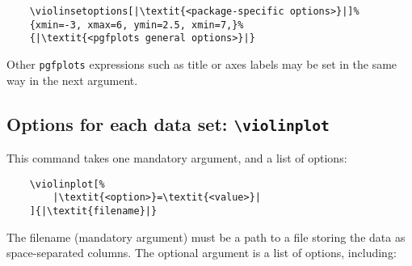 \documentclass{article}
\begin{document}
\begin{verbatim}
	\violinsetoptions[|\textit{<package-specific options>}|]%
	{xmin=-3, xmax=6, ymin=2.5, xmin=7,}%
	{|\textit{<pgfplots general options>}|}
\end{verbatim}

Other \texttt{pgfplots} expressions such as title or axes labels may be set
in the same way in the next argument.

\subsection{Options for each data set: \texttt{{\textbackslash}violinplot}}

This command takes one mandatory argument, and a list of options:

\begin{verbatim}
	\violinplot[%
		|\textit{<option>}=\textit{<value>}|
	]{|\textit{filename}|}
\end{verbatim}

The filename (mandatory argument) must be a path to a file storing the data as
space-separated columns. The optional argument is a list of options, including:
\end{document}
